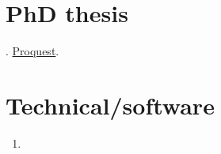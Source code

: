 \documentclass{article}
\begin{document}
\section*{PhD thesis}
\label{sec:org7ed226f}
.  \href{http://search.proquest.com.ezproxy.princeton.edu/pqdtglobal/docview/1831357756/abstract/522E2D42A8BF49C0PQ/1}{Proquest}.

\section*{Technical/software}
\label{sec:orgdb9a0ea}
\begin{enumerate}
\item {}
\end{enumerate}


\end{document}
